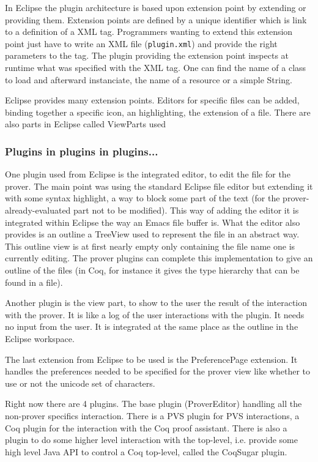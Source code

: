 \documentclass{entcs}
\begin{document}
In Eclipse the plugin architecture is based upon extension point by
extending or providing them. 
Extension points are defined by a unique identifier which is link
to a definition of a XML tag. Programmers wanting to extend
this extension point just have to write an XML file ({\tt plugin.xml}) 
and provide the right parameters to the tag.
The plugin providing the extension point inspects at runtime what was 
specified with the XML tag. One can find the name of a class to load
and afterward instanciate, the name of a resource or a simple String.

Eclipse provides many extension points. Editors for specific files can be
added, binding together a specific icon, an highlighting, the extension of a
file. There are also parts in Eclipse called ViewParts used

\subsubsection{Plugins in plugins in plugins...}
\label{subsubsec:plug-plug-plug}
One plugin used from Eclipse is the integrated editor, to edit the 
file for the prover. The main point was using the standard Eclipse file editor
but extending it with some syntax highlight, a way to block some part
of the text (for the prover-already-evaluated part not to be modified). This
way of adding the editor it is integrated within Eclipse the way an Emacs 
file buffer is.  What the editor also provides is an outline a TreeView
used to represent the file in an abstract way. This outline view
is at first nearly empty only containing the file name one is currently
editing. The prover plugins can complete this implementation to give
an outline of the files (in Coq, for instance it gives the type
hierarchy that can be found in a file).

Another plugin is the view part, to show to the user the result of the
interaction with the prover. It is like a log of the user interactions
with the plugin. It needs no input from the user. It is integrated
at the same place as the outline in the Eclipse workspace.

The last extension from Eclipse to be used is the PreferencePage extension.
It handles the preferences needed to be specified for the prover view
like whether to use or not the unicode set of characters.


Right now there are 4 plugins. The base plugin (ProverEditor)
handling all the non-prover specifics interaction. There is a PVS plugin for
PVS interactions, a Coq plugin for the interaction with the Coq proof 
assistant. There is also a plugin to do some higher level interaction 
with the top-level, i.e. provide some high level Java API to control 
a Coq top-level, called the CoqSugar plugin. 
\end{document}
